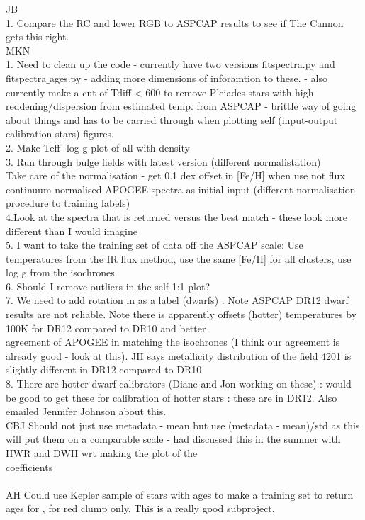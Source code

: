 \documentclass[12pt, preprint]{aastex}
\begin{document}
JB \\
1. Compare the RC and lower RGB to ASPCAP results to see if The Cannon gets this right.\\

MKN \\
1. Need to clean up the code  - currently have two versions fitspectra.py and fitspectra$\_$ages.py - adding more dimensions of inforamtion to these.
- also currently make a cut of Tdiff < 600 to remove Pleiades stars with high reddening/dispersion from estimated temp. from ASPCAP - brittle way of going about things and has to be carried through
when plotting self (input-output calibration stars) figures.\\
2. Make Teff -log g plot of all with density\\
3. Run through bulge fields with latest version (different normalistation)\\
Take care of the normalisation - get 0.1 dex offset in [Fe/H] when use not flux continuum normalised APOGEE spectra as initial input (different normalisation procedure to training labels)\\
4.Look at the spectra that is returned versus the best match - these look more different than I would imagine\\
5. I want to take the training set of data off the ASPCAP scale: Use temperatures from the IR flux method, use the same [Fe/H] for all clusters, use log g from the isochrones\\
6. Should I remove outliers in the self 1:1 plot?\\
7. We need to add rotation in as a label (dwarfs) . Note ASPCAP DR12 dwarf results are not reliable. Note there is apparently offsets (hotter) temperatures by 100K for DR12 compared to DR10 and better\\
agreement of APOGEE in matching the isochrones (I think our agreement is already good - look at this). JH says metallicity distribution of the field 4201 is slightly different in DR12 compared to DR10\\
8. There are hotter dwarf calibrators (Diane and Jon working on these) : would be good to get these for calibration of hotter stars : these are in DR12. Also emailed Jennifer Johnson about this.\\

CBJ
Should not just use metadata - mean but use (metadata - mean)/std as this will put them on a comparable scale - had discussed this in the summer with HWR and DWH wrt making the plot of the\\
coefficients\\
\\
AH
Could use Kepler sample of stars with ages to make a training set to return ages for , for red clump only. This is a really good subproject.\\
\end{document}
